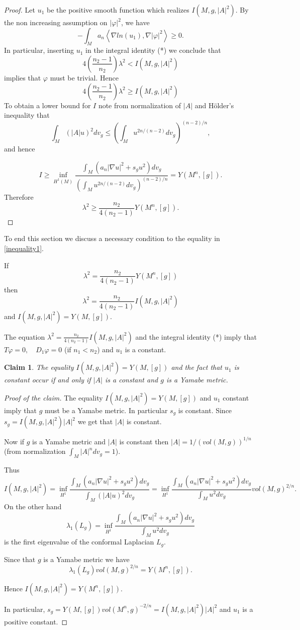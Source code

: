 \documentclass[11pt]{amsart}
\theoremstyle{plain}
\numberwithin{equation}{section}
\theoremstyle{plain}
\newtheorem{claim}{Claim}
\begin{document}
\begin{proof}
Let $u_1$ be the positive smooth function which realizes $I(M,g,|A|^2)$. By the non increasing assumption  on $|\varphi|^2$, we have $$-\int_Ma_n\left\langle\nabla ln(u_1),\nabla |\varphi|^2\right\rangle\geq 0.$$
In particular, inserting $u_1$ in the integral identity (*) we conclude that $$4\left(\frac{n_2-1}{n_2}\right)\lambda^2< I(M,g,|A|^2)$$
implies that $\varphi$ must be trivial.
Hence  $$4\left(\frac{n_2-1}{n_2}\right)\lambda^2\geq I(M,g,|A|^2)$$
To obtain a lower bound for $I$ note from normalization of $|A|$ and Hölder's inequality that $$\int_M (|A|u)^2dv_g\leq \left(\int_Mu^{2n/(n-2)}dv_g\right)^{(n-2)/n},$$
and hence

 $$I\geq \inf_{H^1(M)} \frac{\int_M\left( a_n|\nabla u|^2+s_gu^2\right)dv_g}{\left(\int_Mu^{2n/(n-2)}dv_g\right)^{(n-2)/n}}=Y(M^n,[g]). $$ 
Therefore $$\lambda^2\geq \frac{n_2}{4(n_2-1)}Y(M^n,[g]).$$
\end{proof}

To end this section we discuss a necessary condition to the equality in \eqref{inequality1}.

If $$\lambda^2=\frac{n_2}{4(n_2-1)}Y(M^n,[g])$$ then
$$\lambda^2=\frac{n_2}{4(n_2-1)}I(M,g,|A|^2)$$ and $I(M,g,|A|^2)=Y(M,[g])$.

The equation $\lambda^2=\frac{n_2}{4(n_2-1)}I(M,g,|A|^2)$ and the integral identity (*) imply that $T\varphi=0,\quad D_1\varphi=0$ (if $n_1<n_2$) and $u_1$ is a constant.

\begin{claim}\label{Claim1}
The equality $I(M,g,|A|^2)=Y(M,[g])$  and the fact that $u_1$ is constant occur if and only if  $|A|$ is a constant and $g$ is a Yamabe metric.
\end{claim}
\begin{proof}[Proof of the claim]
The equality $I(M,g,|A|^2)=Y(M,[g])$  and $u_1$ constant imply that $g$ must be a Yamabe metric. In particular $s_g$ is constant. Since $s_g=I(M,g,|A|^2)|A|^2$ we get that $|A|$ is constant.

Now if $g$ is a Yamabe metric and $|A|$ is constant then
$|A|=1/(vol(M,g))^{1/n}$ (from normalization  $\int_M |A|^ndv_g=1$).

Thus $$I(M,g,|A|^2)=\inf_{H^1}\frac{\int_M\left( a_n|\nabla u|^2+s_gu^2\right)dv_g}{\int_M (|A|u)^2dv_g}= \inf_{H^1}\frac{\int_M\left( a_n|\nabla u|^2+s_gu^2\right)dv_g}{\int_M u^2dv_g}vol(M,g)^{2/n}.$$
On the other hand $$\lambda_1(L_g)=\inf_{H^1}\frac{\int_M\left( a_n|\nabla u|^2+s_gu^2\right)dv_g}{\int_M u^2dv_g}$$
is the first eigenvalue of the conformal Laplacian $L_g$. 

Since that $g$ is a Yamabe metric we have $$\lambda_1(L_g)vol(M,g)^{2/n}=Y(M^n,[g]).$$

Hence $I(M,g,|A|^2)=Y(M^n ,[g])$.

In particular, $s_g=Y(M,[g])vol(M^n,g)^{-2/n}=I(M,g,|A|^2)|A|^2$ and $u_1$ is a positive constant.
\end{proof}
\end{document}
